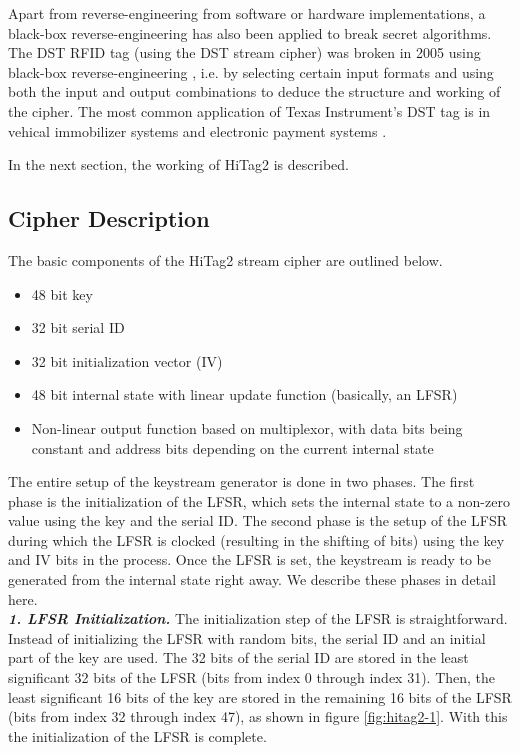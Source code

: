 Apart from reverse-engineering from software or hardware implementations, a black-box reverse-engineering has also been applied to break secret algorithms. The DST RFID tag (using the DST stream cipher) was broken in 2005 using black-box reverse-engineering \cite{bono2005sac}, i.e. by selecting certain input formats and using both the input and output combinations to deduce the structure and working of the cipher. The most common application of Texas Instrument's DST tag is in vehical immobilizer systems and electronic payment systems \cite{dst-rfid-analysis}. 

In the next section, the working of HiTag2 is described.

\subsection{Cipher Description}
The basic components of the HiTag2 stream cipher are outlined below.
\begin{itemize}
\item 48 bit key
\item 32 bit serial ID
\item 32 bit initialization vector (IV)
\item 48 bit internal state with linear update function (basically, an LFSR)
\item Non-linear output function based on multiplexor, with data bits being constant and address bits depending on the current internal state
\end{itemize}

The entire setup of the keystream generator is done in two phases. The first phase is the initialization of the LFSR, which sets the internal state to a non-zero value using the key and the serial ID. The second phase is the setup of the LFSR during which the LFSR is clocked (resulting in the shifting of bits) using the key and IV bits in the process. Once the LFSR is set, the keystream is ready to be generated from the internal state right away. We describe these phases in detail here.\\ 

\noindent \textit{\textbf{1. LFSR Initialization.}} The initialization step of the LFSR is straightforward. Instead of initializing the LFSR with random bits, the serial ID and an initial part of the key are used. The 32 bits of the serial ID are stored in the least significant 32 bits of the LFSR (bits from index 0 through index 31). Then, the least significant 16 bits of the key are stored in the remaining 16 bits of the LFSR (bits from index 32 through index 47), as shown in figure \ref{fig:hitag2-1}. With this the initialization of the LFSR is complete.\\

